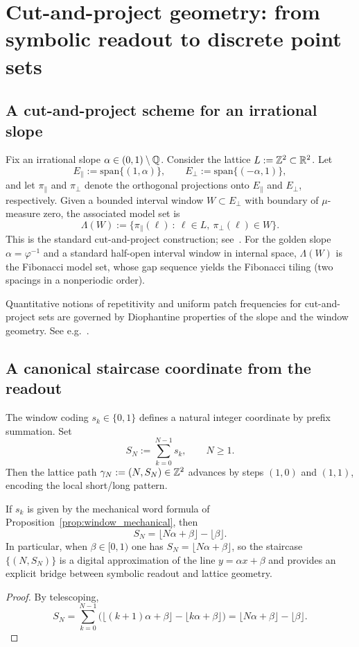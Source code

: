 \section{Cut-and-project geometry: from symbolic readout to discrete point sets}
\label{sec:cut_project}

\subsection{A cut-and-project scheme for an irrational slope}
Fix an irrational slope $\alpha\in(0,1)\setminus\mathbb{Q}$. Consider the lattice $L:=\mathbb{Z}^2\subset\mathbb{R}^2$. Let
$$
E_\parallel:=\mathrm{span}\{(1,\alpha)\},\qquad E_\perp:=\mathrm{span}\{(-\alpha,1)\},
$$
and let $\pi_\parallel$ and $\pi_\perp$ denote the orthogonal projections onto $E_\parallel$ and $E_\perp$, respectively. Given a bounded interval window $W\subset E_\perp$ with boundary of $\mu$-measure zero, the associated model set is
$$
\Lambda(W):=\{\pi_\parallel(\ell)\ :\ \ell\in L,\ \pi_\perp(\ell)\in W\}.
$$
This is the standard cut-and-project construction; see~\cite{Moody2000}. For the golden slope $\alpha=\varphi^{-1}$ and a standard half-open interval window in internal space, $\Lambda(W)$ is the Fibonacci model set, whose gap sequence yields the Fibonacci tiling (two spacings in a nonperiodic order).
\begin{remark}
Quantitative notions of repetitivity and uniform patch frequencies for cut-and-project sets are governed by Diophantine properties of the slope and the window geometry. See e.g.~\cite{LagariasPleasants2003,KoivusaloWalton2022}.
\end{remark}

\subsection{A canonical staircase coordinate from the readout}
The window coding $s_k\in\{0,1\}$ defines a natural integer coordinate by prefix summation. Set
$$
S_N:=\sum_{k=0}^{N-1} s_k,\qquad N\ge 1.
$$
Then the lattice path $\gamma_N:=(N,S_N)\in\mathbb{Z}^2$ advances by steps $(1,0)$ and $(1,1)$, encoding the local short/long pattern.

\begin{proposition}
\label{prop:prefix_sum}
If $s_k$ is given by the mechanical word formula of Proposition~\ref{prop:window_mechanical}, then
$$
S_N=\big\lfloor N\alpha+\beta\big\rfloor-\big\lfloor \beta\big\rfloor.
$$
In particular, when $\beta\in[0,1)$ one has $S_N=\lfloor N\alpha+\beta\rfloor$, so the staircase $\{(N,S_N)\}$ is a digital approximation of the line $y=\alpha x+\beta$ and provides an explicit bridge between symbolic readout and lattice geometry.
\end{proposition}

\begin{proof}
By telescoping,
$$
S_N=\sum_{k=0}^{N-1}\Big(\big\lfloor (k+1)\alpha+\beta\big\rfloor-\big\lfloor k\alpha+\beta\big\rfloor\Big)
=\big\lfloor N\alpha+\beta\big\rfloor-\big\lfloor \beta\big\rfloor.
$$
\end{proof}
